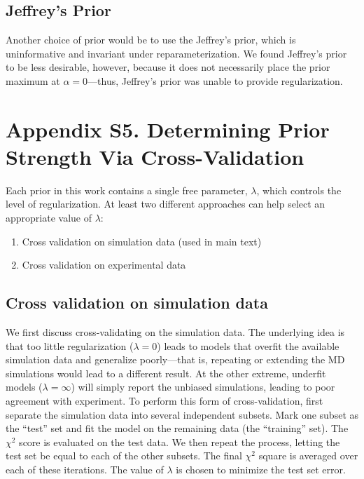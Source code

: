 \documentclass[12pt]{article}
\begin{document}
\subsection*{Jeffrey's Prior}

Another choice of prior would be to use the Jeffrey's prior, which is uninformative and invariant under reparameterization.  We found Jeffrey's prior to be less desirable, however, because it does not necessarily place the prior maximum at $\alpha = 0$---thus, Jeffrey's prior was unable to provide regularization. 

\newpage

\section*{Appendix S5.  Determining Prior Strength Via Cross-Validation}

Each prior in this work contains a single free parameter, $\lambda$, which controls the level of regularization.  At least two different approaches can help select an appropriate value of $\lambda$:

\begin{enumerate}
 \item Cross validation on simulation data (used in main text)
 \item Cross validation on experimental data
\end{enumerate}

\subsection*{Cross validation on simulation data}

We first discuss cross-validating on the simulation data.  The underlying idea is that too little regularization ($\lambda = 0$) leads to models that overfit the available simulation data and generalize poorly---that is, repeating or extending the MD simulations would lead to a different result.  At the other extreme, underfit models ($\lambda = \infty$) will simply report the unbiased simulations, leading to poor agreement with experiment.  To perform this form of cross-validation, first separate the simulation data into several independent subsets.  Mark one subset as the ``test'' set and fit the model on the remaining data (the ``training'' set).  The $\chi^2$ score is evaluated on the test data.  We then repeat the process, letting the test set be equal to each of the other subsets.  The final $\chi^2$ square is averaged over each of these iterations.  The value of $\lambda$ is chosen to minimize the test set error.
\end{document}
